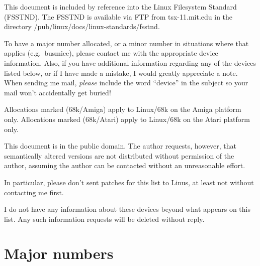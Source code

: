 This document is included by reference into the Linux Filesystem
Standard (FSSTND).  The FSSTND is available via FTP from
tsx-11.mit.edu in the directory {\file
/pub/linux/docs/linux-standards/fsstnd}.

To have a major number allocated, or a minor number in situations
where that applies (e.g.\ busmice), please contact me with the
appropriate device information.  Also, if you have additional
information regarding any of the devices listed below, or if I have
made a mistake, I would greatly appreciate a note.  When sending me
mail, {\em please\/} include the word ``device'' in the subject so
your mail won't accidentally get buried!

Allocations marked (68k/Amiga) apply to Linux/68k on the Amiga
platform only.  Allocations marked (68k/Atari) apply to Linux/68k on
the Atari platform only.

This document is in the public domain.  The author requests, however,
that semantically altered versions are not distributed without
permission of the author, assuming the author can be contacted without
an unreasonable effort.

In particular, please don't sent patches for this list to Linus, at
least not without contacting me first.

I do not have any information about these devices beyond what appears
on this list.  Any such information requests will be deleted without
reply.

\section{Major numbers}

